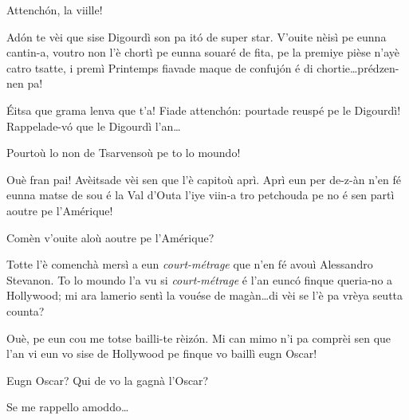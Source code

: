 \begin{drama}
\Joellespeaks{} Attench\'on, la viille!




\scene[-- Hollywood]

\Nevaouspeaks{} Ad\'on te vèi que sise Digourdì son pa it\'o de super star. V'ouite nèisì pe eunna cantin-a, voutro non l'è chortì pe eunna souaré de fita, pe la premiye pièse n'ayè catro tsatte, i premì Printemps fiavade  maque de confuj\'on é di chortie\ldots prédzen-nen pa!

\Paganspeaks \'Eitsa que grama lenva que t'a! Fiade attench\'on: pourtade reuspé pe le Digourdì! Rappelade-v\'o  que le Digourdì l'an\ldots

\Ledouspeaks Pourtoù lo non de Tsarvensoù pe to lo moun\-do!

\Paganspeaks Ouè fran pai!  Avèitsade vèi sen que l'è capitoù aprì. Aprì eun per de-z-àn n'en fé eunna matse de sou é la Val d’Outa l'iye viin-a tro petchouda pe no é sen partì aoutre pe l’Amérique!

\Nevaousaspeaks Comèn v'ouite aloù aoutre pe l’Amérique?

\Paganspeaks  Totte l'è comenchà mersì a eun \textit{court-métrage} que n'en fé avouì Alessandro Stevanon. To lo moundo l'a vu si \textit{court-mé\-tra\-ge} é l'an euncó finque queria-no a Hollywood; mi ara lamerio sentì la vouése de magàn\ldots di vèi se l'è pa vrèya seutta counta?

\Maganspeaks Ouè, pe eun cou me totse bailli-te rèiz\'on. Mi can mimo n'i pa comprèi sen que l'an vi eun vo sise de Hollywood pe finque vo baillì eugn Oscar!

\Nevaousaspeaks Eugn Oscar? Qui de vo la gagnà l’Oscar?

\Paganspeaks Se me rappello amoddo\ldots






\end{drama}
